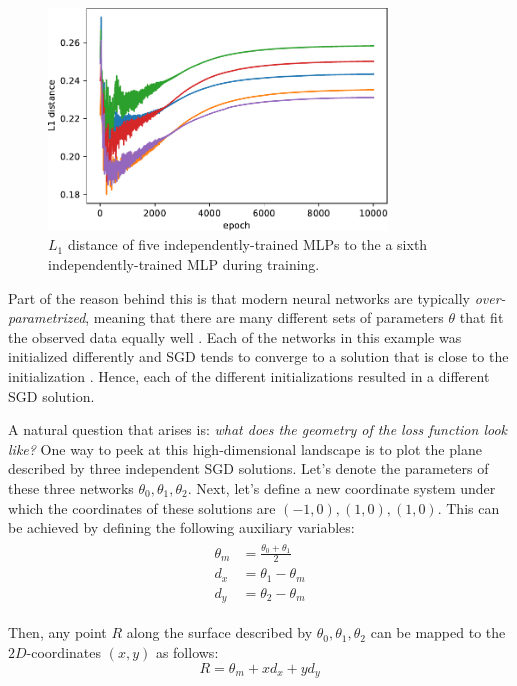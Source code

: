 \documentclass[12pt]{article}
\begin{document}
\begin{figure}[H]
\centering
\includegraphics[width=9cm]{plots/1d_ens_param_distance.pdf}
\caption{$L_1$ distance of five independently-trained MLPs to the a sixth independently-trained MLP during training.}
\label{fig_1d_ens_param_distance}
\end{figure}

Part of the reason behind this is that modern neural networks are typically \textit{over-parametrized}, meaning that there are many different sets of parameters $\theta$ that fit the observed data equally well \cite{underspecification, deep_ens, mode_connectivity}. Each of the networks in this example was initialized differently and SGD tends to converge to a solution that is close to the initialization \cite{knowledge_distillation}. Hence, each of the different initializations resulted in a different SGD solution.

A natural question that arises is: \textit{what does the geometry of the loss function look like?} One way to peek at this high-dimensional landscape is to plot the plane described by three independent SGD solutions. Let's denote the parameters of these three networks $\theta_0, \theta_1, \theta_2$. Next, let's define a new coordinate system under which the coordinates of these solutions are $(-1, 0), (1, 0), (1, 0)$. This can be achieved by defining the following auxiliary variables:
\begin{align}
\begin{split}
\theta_m &= \frac{\theta_0 + \theta_1}{2} \\
d_x &= \theta_1 - \theta_m \\
d_y &= \theta_2 - \theta_m
\end{split}
\end{align}

Then, any point $R$ along the surface described by $\theta_0, \theta_1, \theta_2$ can be mapped to the $2D$-coordinates $(x, y)$ as follows:
\begin{equation}
R = \theta_m + x d_x + y d_y
\end{equation}
\end{document}
